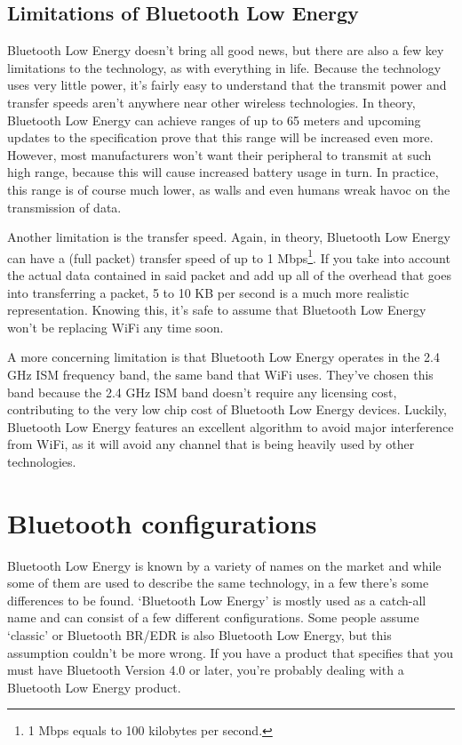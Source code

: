\documentclass[pdftex,a4paper,12pt,twoside]{report}
\begin{document}
\subsection{Limitations of Bluetooth Low Energy}
\label{subsec:limitations}
Bluetooth Low Energy doesn't bring all good news, but there are also a few key limitations to the technology, as with everything in life. Because the technology uses very little power, it's fairly easy to understand that the transmit power and transfer speeds aren't anywhere near other wireless technologies. In theory, Bluetooth Low Energy can achieve ranges of up to 65 meters and upcoming updates to the specification prove that this range will be increased even more. However, most manufacturers won't want their peripheral to transmit at such high range, because this will cause increased battery usage in turn. In practice, this range is of course much lower, as walls and even humans wreak havoc on the transmission of data.

Another limitation is the transfer speed. Again, in theory, Bluetooth Low Energy can have a (full packet) transfer speed of up to 1 Mbps\footnote{1 Mbps equals to 100 kilobytes per second.}. If you take into account the actual data contained in said packet and add up all of the overhead that goes into transferring a packet, 5 to 10 KB per second is a much more realistic representation. Knowing this, it's safe to assume that Bluetooth Low Energy won't be replacing WiFi any time soon.

A more concerning limitation is that Bluetooth Low Energy operates in the 2.4 GHz ISM frequency band, the same band that WiFi uses. They've chosen this band because the 2.4 GHz ISM band doesn't require any licensing cost, contributing to the very low chip cost of Bluetooth Low Energy devices. Luckily, Bluetooth Low Energy features an excellent algorithm to avoid major interference from WiFi, as it will avoid any channel that is being heavily used by other technologies.

\section{Bluetooth configurations}
\label{sec:bleconfigurations}
Bluetooth Low Energy is known by a variety of names on the market and while some of them are used to describe the same technology, in a few there's some differences to be found. `Bluetooth Low Energy' is mostly used as a catch-all name and can consist of a few different configurations. Some people assume `classic' or Bluetooth BR/EDR is also Bluetooth Low Energy, but this assumption couldn't be more wrong. If you have a product that specifies that you must have Bluetooth Version 4.0 or later, you're probably dealing with a Bluetooth Low Energy product.
\end{document}
